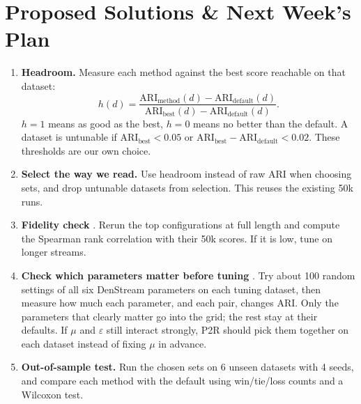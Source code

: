 \section{Proposed Solutions \& Next Week's Plan}
\label{sec:next}

\begin{enumerate}[label=\textbf{(\alph*)},leftmargin=2em,itemsep=3pt]
  \item \textbf{Headroom.} Measure each method against the best score reachable on that dataset:
  \[
    h(d) = \frac{\text{ARI}_{\text{method}}(d) - \text{ARI}_{\text{default}}(d)}{\text{ARI}_{\text{best}}(d) - \text{ARI}_{\text{default}}(d)}.
  \]
  $h=1$ means as good as the best, $h=0$ means no better than the default. A dataset is untunable if $\text{ARI}_{\text{best}} < 0.05$ or $\text{ARI}_{\text{best}} - \text{ARI}_{\text{default}} < 0.02$. These thresholds are our own choice.
  \item \textbf{Select the way we read.} Use headroom instead of raw ARI when choosing sets, and drop untunable datasets from selection. This reuses the existing 50k runs.
  \item \textbf{Fidelity check} \cite{klein2017fabolas}. Rerun the top configurations at full length and compute the Spearman rank correlation with their 50k scores. If it is low, tune on longer streams.
  \item \textbf{Check which parameters matter before tuning} \cite{hutter2014fanova,vanrijn2018importance}. Try about 100 random settings of all six DenStream parameters on each tuning dataset, then measure how much each parameter, and each pair, changes ARI. Only the parameters that clearly matter go into the grid; the rest stay at their defaults. If $\mu$ and $\varepsilon$ still interact strongly, P2R should pick them together on each dataset instead of fixing $\mu$ in advance.
  \item \textbf{Out-of-sample test.} Run the chosen sets on 6 unseen datasets with 4 seeds, and compare each method with the default using win/tie/loss counts and a Wilcoxon test.
\end{enumerate}

